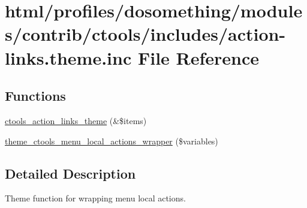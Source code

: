 \hypertarget{action-links_8theme_8inc}{
\section{html/profiles/dosomething/modules/contrib/ctools/includes/action-\/links.theme.inc File Reference}
\label{action-links_8theme_8inc}
}
\subsection*{Functions}
\begin{DoxyCompactItemize}
\item 
\hyperlink{action-links_8theme_8inc_a2e3db09f0736b3a266982b5d90e575e1}{ctools\_\-action\_\-links\_\-theme} (\&\$items)
\item 
\hyperlink{action-links_8theme_8inc_afe90632f344fea0f367310221e0338d1}{theme\_\-ctools\_\-menu\_\-local\_\-actions\_\-wrapper} (\$variables)
\end{DoxyCompactItemize}


\subsection{Detailed Description}
Theme function for wrapping menu local actions. 

